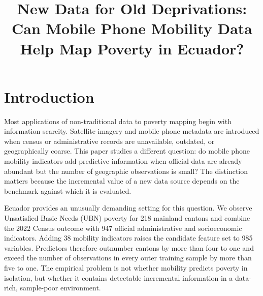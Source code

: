 \documentclass[pdflatex,sn-apa]{sn-jnl}
\begin{document}
\raggedbottom
\title{New Data for Old Deprivations: Can Mobile Phone Mobility Data Help Map Poverty in Ecuador?}
\maketitle

\section{Introduction}
\label{sec:introduction}


Most applications of non-traditional data to poverty mapping begin with information scarcity. Satellite imagery and mobile phone metadata are introduced when census or administrative records are unavailable, outdated, or geographically coarse. This paper studies a different question: do mobile phone mobility indicators add predictive information when official data are already abundant but the number of geographic observations is small? The distinction matters because the incremental value of a new data source depends on the benchmark against which it is evaluated.

Ecuador provides an unusually demanding setting for this question. We observe Unsatisfied Basic Needs (UBN) poverty for 218 mainland cantons and combine the 2022 Census outcome with 947 official administrative and socioeconomic indicators. Adding 38 mobility indicators raises the candidate feature set to 985 variables. Predictors therefore outnumber cantons by more than four to one and exceed the number of observations in every outer training sample by more than five to one. The empirical problem is not whether mobility predicts poverty in isolation, but whether it contains detectable incremental information in a data-rich, sample-poor environment.
\end{document}
